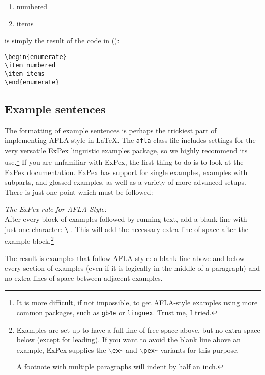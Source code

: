 \documentclass{afla}
\begin{document}
\begin{enumerate}
\item numbered
\item items
\end{enumerate}

\noindent is simply the result of the code in (\nextx):

\ex \verb`\begin{enumerate}`\\
	\verb`\item numbered`\\
	\verb`\item items`\\
	\verb`\end{enumerate}`
\xe

\subsection{Example sentences}

The formatting of example sentences is perhaps the trickiest part of implementing AFLA style in \LaTeX. The \verb`afla` class file includes settings for the very versatile ExPex linguistic examples package, so we highly recommend its use.\footnote{It is more difficult, if not impossible, to get AFLA-style examples using more common packages, such as \texttt{gb4e} or \texttt{linguex}. Trust me, I tried.} If you are unfamiliar with ExPex, the first thing to do is to look at the ExPex documentation. ExPex has support for single examples, examples with subparts, and glossed examples, as well as a variety of more advanced setups. There is just one point which must be followed:

\ex \textit{The ExPex rule for AFLA Style:}\\
	After every block of examples followed by running text, add a blank line with just one character: \verb`\` . This will add the necessary extra line of space after the example block.\footnote{Examples are set up to have a full line of free space above, but no extra space below (except for leading). If you want to avoid the blank line above an example, ExPex supplies the $\backslash$\texttt{ex\~} and $\backslash$\texttt{pex\~} variants for this purpose.
	
	A footnote with multiple paragraphs will indent by half an inch.}
\xe
\

\noindent The result is examples that follow AFLA style: a blank line above and below every section of examples (even if it is logically in the middle of a paragraph) and no extra lines of space between adjacent examples.
\end{document}
